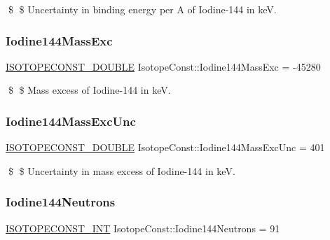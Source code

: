 \$ \$ Uncertainty in binding energy per A of Iodine-\/144 in keV. \mbox{\label{group___isotope_const-_iodine-_i144_gab5572a02161ad5b77da5f9b8f18fb914}} 
\subsubsection{\texorpdfstring{Iodine144\+Mass\+Exc}{Iodine144MassExc}}
{\footnotesize\ttfamily \mbox{\hyperlink{group___isotope_const-_macros_ga8f45a7272ce02c0b4c65c44636ed719a}{I\+S\+O\+T\+O\+P\+E\+C\+O\+N\+S\+T\+\_\+\+D\+O\+U\+B\+LE}} Isotope\+Const\+::\+Iodine144\+Mass\+Exc = -\/45280}

\$ \$ Mass excess of Iodine-\/144 in keV. \mbox{\label{group___isotope_const-_iodine-_i144_ga18148abbd122427c136286b1dd7cc2ec}} 
\subsubsection{\texorpdfstring{Iodine144\+Mass\+Exc\+Unc}{Iodine144MassExcUnc}}
{\footnotesize\ttfamily \mbox{\hyperlink{group___isotope_const-_macros_ga8f45a7272ce02c0b4c65c44636ed719a}{I\+S\+O\+T\+O\+P\+E\+C\+O\+N\+S\+T\+\_\+\+D\+O\+U\+B\+LE}} Isotope\+Const\+::\+Iodine144\+Mass\+Exc\+Unc = 401}

\$ \$ Uncertainty in mass excess of Iodine-\/144 in keV. \mbox{\label{group___isotope_const-_iodine-_i144_ga9d984323d02a2397a83384ae2fe2944f}} 
\subsubsection{\texorpdfstring{Iodine144\+Neutrons}{Iodine144Neutrons}}
{\footnotesize\ttfamily \mbox{\hyperlink{group___isotope_const-_macros_ga5f18360b3e99483a35c32d789e62621c}{I\+S\+O\+T\+O\+P\+E\+C\+O\+N\+S\+T\+\_\+\+I\+NT}} Isotope\+Const\+::\+Iodine144\+Neutrons = 91}

